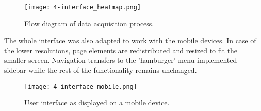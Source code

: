 \begin{figure}[h]
  \begin{center}
    \texttt{[image: 4-interface\_heatmap.png]}
  \end{center}
  \caption{Flow diagram of data acquisition process.}
  \label{fig:interface_heatmap}
\end{figure}

The whole interface was also adapted to work with the mobile devices. In case of the lower resolutions, page elements are redistributed and resized to fit the smaller screen. Navigation transfers to the 'hamburger' menu implemented sidebar while the rest of the functionality remains unchanged.

\begin{figure}[h]
  \begin{center}
    \texttt{[image: 4-interface\_mobile.png]}
  \end{center}
  \caption{User interface as displayed on a mobile device.}
  \label{fig:interface_mobile}
\end{figure}